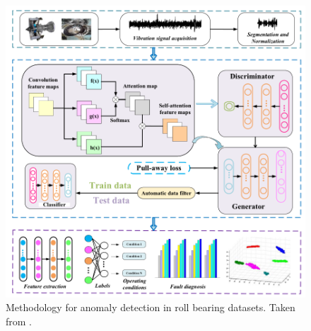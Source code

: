     

\begin{figure}[ht]
\centering
\includegraphics[scale=0.4]{figures/liu.etal_2022.png}
\caption[Roll bearing anomaly methodology]{Methodology for anomaly detection in roll bearing datasets. Taken from \cite{liu.etal_DataSynthesisUsing_2022}.}
\label{fig:liu.etal_2022}
\end{figure}

